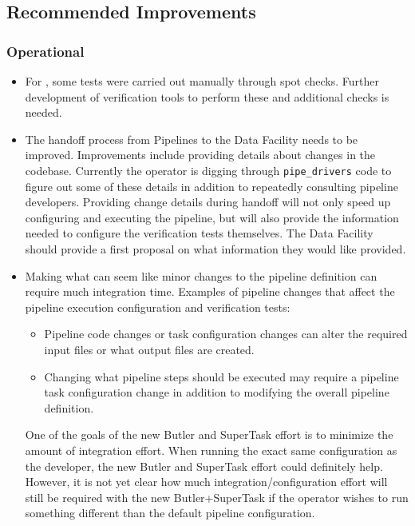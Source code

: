 \documentclass[DM,STR,toc]{lsstdoc}
\begin{document}
\subsection{Recommended Improvements}
\label{sect:recommendations}

\subsubsection{Operational}

\begin{itemize}

  \item{
    For \milestoneId{}, some tests were carried out manually through spot checks.
    Further development of verification tools to perform these and additional checks is needed.
  }

  \item{
    The handoff process from Pipelines to the Data Facility needs to be improved.
    Improvements include providing details about changes in the codebase.
    Currently the operator is digging through \texttt{pipe{\_}drivers} code to figure out some of these details in addition to repeatedly consulting pipeline developers.
    Providing change details during handoff will not only speed up configuring and executing the pipeline, but will also provide the information needed to configure the verification tests themselves.
    The Data Facility should provide a first proposal on what information they would like provided.
  }

  \item{
    Making what can seem like minor changes to the pipeline definition can require much integration time.
    Examples of pipeline changes that affect the pipeline execution configuration and verification tests:

    \begin{itemize}

      \item{Pipeline code changes or task configuration changes can alter the required input files or what output files are created.}
      \item{Changing what pipeline steps should be executed may require a pipeline task configuration change in addition to modifying the overall pipeline definition.}

    \end{itemize}

    One of the goals of the new Butler and SuperTask effort is to minimize the amount of integration effort.
    When running the exact same configuration as the developer, the new Butler and SuperTask effort could definitely help.
    However, it is not yet clear how much integration/configuration effort will still be required with the new Butler+SuperTask if the operator wishes to run something different than the default pipeline configuration.
  }


\end{itemize}
\end{document}
